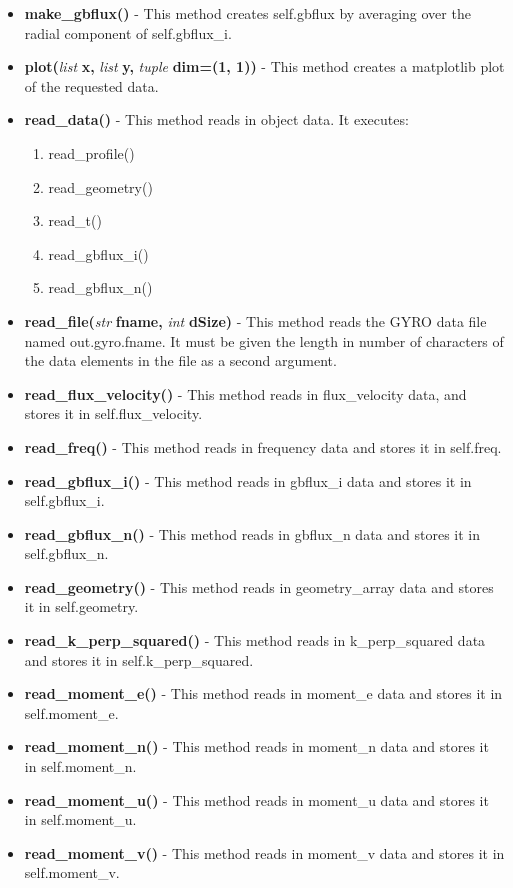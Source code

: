 \documentclass{article}
\begin{document}
\begin{itemize}
\begin{itemize}
\item \textbf{make\_gbflux()} - This method creates self.gbflux by averaging over the radial component of self.gbflux\_i.
\item \textbf{plot(}\emph{list}\textbf{ x,}\emph{ list}\textbf{ y,}\emph{ tuple}\textbf{ dim=(1, 1))} - This method creates a matplotlib plot of the requested data.
\item \textbf{read\_data()} - This method reads in object data.  It executes:
\begin{enumerate}
\item read\_profile()
\item read\_geometry()
\item read\_t()
\item read\_gbflux\_i()
\item read\_gbflux\_n()
\end{enumerate}
\item \textbf{read\_file(}\emph{str}\textbf{ fname,}\emph{ int}\textbf{ dSize)} - This method reads the GYRO data file named out.gyro.fname.  It must be given the length in number of characters of the data elements in the file as a second argument.
\item \textbf{read\_flux\_velocity()} - This method reads in flux\_velocity data, and stores it in self.flux\_velocity.
\item \textbf{read\_freq()} - This method reads in frequency data and stores it in self.freq.
\item \textbf{read\_gbflux\_i()} - This method reads in gbflux\_i data and stores it in self.gbflux\_i.
\item \textbf{read\_gbflux\_n()} - This method reads in gbflux\_n data and stores it in self.gbflux\_n.
\item \textbf{read\_geometry()} - This method reads in geometry\_array data and stores it in self.geometry.
\item \textbf{read\_k\_perp\_squared()} - This method reads in k\_perp\_squared data and stores it in self.k\_perp\_squared.
\item \textbf{read\_moment\_e()} - This method reads in moment\_e data and stores it in self.moment\_e.
\item \textbf{read\_moment\_n()} - This method reads in moment\_n data and stores it in self.moment\_n.
\item \textbf{read\_moment\_u()} - This method reads in moment\_u data and stores it in self.moment\_u.
\item \textbf{read\_moment\_v()} - This method reads in moment\_v data and stores it in self.moment\_v.

\end{itemize}
\end{itemize}
\end{document}
